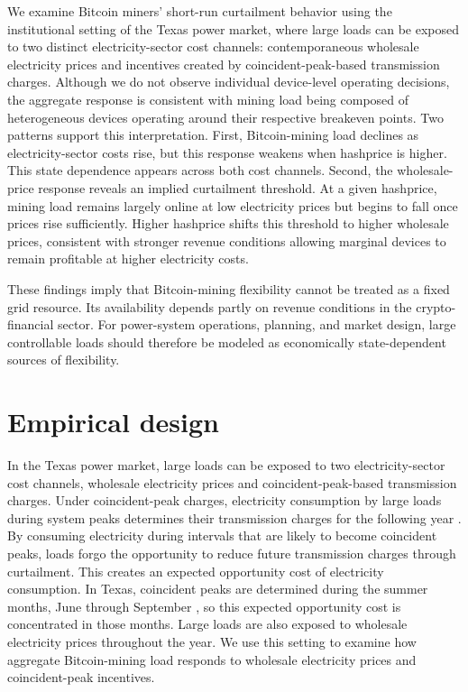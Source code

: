 \documentclass[pdflatex,sn-mathphys-num]{sn-jnl}%
\theoremstyle{thmstyleone}%
\theoremstyle{thmstyletwo}%
\theoremstyle{thmstylethree}%
\begin{document}
We examine Bitcoin miners' short-run curtailment behavior using the institutional setting of the Texas power market, where large loads can be exposed to two distinct electricity-sector cost channels: contemporaneous wholesale electricity prices and incentives created by coincident-peak-based transmission charges. Although we do not observe individual device-level operating decisions, the aggregate response is consistent with mining load being composed of heterogeneous devices operating around their respective breakeven points. Two patterns support this interpretation. First, Bitcoin-mining load declines as electricity-sector costs rise, but this response weakens when hashprice is higher. This state dependence appears across both cost channels. Second, the wholesale-price response reveals an implied curtailment threshold. At a given hashprice, mining load remains largely online at low electricity prices but begins to fall once prices rise sufficiently. Higher hashprice shifts this threshold to higher wholesale prices, consistent with stronger revenue conditions allowing marginal devices to remain profitable at higher electricity costs.

These findings imply that Bitcoin-mining flexibility cannot be treated as a fixed grid resource. Its availability depends partly on revenue conditions in the crypto-financial sector. For power-system operations, planning, and market design, large controllable loads should therefore be modeled as economically state-dependent sources of flexibility.

\section{Empirical design}\label{sec:design}

In the Texas power market, large loads can be exposed to two electricity-sector cost channels, wholesale electricity prices and coincident-peak-based transmission charges. Under coincident-peak charges, electricity consumption by large loads during system peaks determines their transmission charges for the following year \cite{baldick2018incentive, carmona2026coincident}. By consuming electricity during intervals that are likely to become coincident peaks, loads forgo the opportunity to reduce future transmission charges through curtailment. This creates an expected opportunity cost of electricity consumption. In Texas, coincident peaks are determined during the summer months, June through September \cite{PUCT1999_25_192}, so this expected opportunity cost is concentrated in those months. Large loads are also exposed to wholesale electricity prices throughout the year. We use this setting to examine how aggregate Bitcoin-mining load responds to wholesale electricity prices and coincident-peak incentives.
\end{document}
